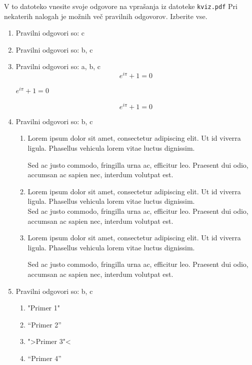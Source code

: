 \documentclass[11pt]{article}
\begin{document}
V to datoteko vnesite svoje odgovore na vprašanja iz datoteke \texttt{kviz.pdf}
Pri nekaterih nalogah je možnih več pravilnih odgovorov. Izberite vse.

\begin{enumerate}
    \item Pravilni odgovori so: c %
    
    \item Pravilni odgovori so: b, c %
    
    \item Pravilni odgovori so: a, b, c  %
      \[ e^{i \pi} + 1 = 0 \]
      \begin{center}
          \( e^{i \pi} + 1 = 0 \)
      \end{center}
      \begin{equation*}
          e^{i \pi} + 1 = 0
      \end{equation*}

    \item Pravilni odgovori so: b, c %
        \begin{enumerate}
            \item {
Lorem ipsum dolor sit amet, consectetur adipiscing 
elit. Ut id viverra ligula. Phasellus vehicula lorem 
vitae luctus dignissim. 
                
Sed ac justo commodo, fringilla urna ac, efficitur 
leo. Praesent dui odio, accumsan ac sapien nec, 
interdum volutpat est. 
            }
            \item {
Lorem ipsum dolor sit amet, consectetur adipiscing 
elit. Ut id viverra ligula. Phasellus vehicula lorem 
vitae luctus dignissim. \\
Sed ac justo commodo, fringilla urna ac, efficitur 
leo. Praesent dui odio, accumsan ac sapien nec, 
interdum volutpat est.             }
            \item {
Lorem ipsum dolor sit amet, consectetur adipiscing 
elit. Ut id viverra ligula. Phasellus vehicula lorem 
vitae luctus dignissim. \par
Sed ac justo commodo, fringilla urna ac, efficitur 
leo. Praesent dui odio, accumsan ac sapien nec, 
interdum volutpat est.             }
        \end{enumerate}
    
      \item Pravilni odgovori so: b, c  %
        \begin{enumerate}
          \item "Primer 1"
          \item ``Primer 2''
          \item ">Primer 3"<
          \item "`Primer 4"'
        \end{enumerate}


\end{enumerate}
\end{document}
